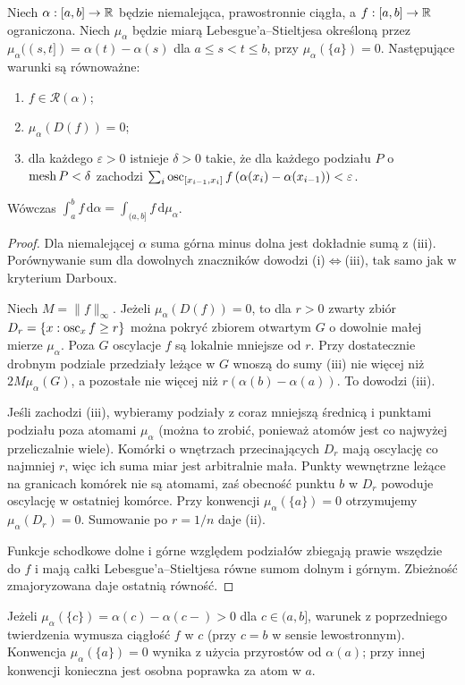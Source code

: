 \begin{twierdzenie}
Niech $\alpha:[a,b]\to\mathbb R$ będzie niemalejąca, prawostronnie ciągła, a $f:[a,b]\to\mathbb R$ ograniczona. Niech $\mu_\alpha$ będzie miarą Lebesgue'a--Stieltjesa określoną przez $\mu_\alpha((s,t])=\alpha(t)-\alpha(s)$ dla $a\le s<t\le b$, przy $\mu_\alpha(\{a\})=0$. Następujące warunki są równoważne:
\begin{enumerate}[label=(\roman*)]
\item $f\in\mathcal R(\alpha)$;
\item $\mu_\alpha(D(f))=0$;
\item dla każdego $\varepsilon>0$ istnieje $\delta>0$ takie, że dla każdego podziału $P$ o $\operatorname{mesh} P<\delta$ zachodzi $\sum_i\operatorname{osc}_{[x_{i-1},x_i]}f\,(\alpha(x_i)-\alpha(x_{i-1}))<\varepsilon$.
\end{enumerate}
Wówczas $\int_a^b f\,\mathrm d\alpha=\int_{(a,b]}f\,\mathrm d\mu_\alpha$.
\end{twierdzenie}
\begin{proof}
Dla niemalejącej $\alpha$ suma górna minus dolna jest dokładnie sumą z (iii). Porównywanie sum dla dowolnych znaczników dowodzi (i)$\Leftrightarrow$(iii), tak samo jak w kryterium Darboux.

Niech $M=\|f\|_\infty$. Jeżeli $\mu_\alpha(D(f))=0$, to dla $r>0$ zwarty zbiór $D_r=\{x:\operatorname{osc}_x f\ge r\}$ można pokryć zbiorem otwartym $G$ o dowolnie małej mierze $\mu_\alpha$. Poza $G$ oscylacje $f$ są lokalnie mniejsze od $r$. Przy dostatecznie drobnym podziale przedziały leżące w $G$ wnoszą do sumy (iii) nie więcej niż $2M\mu_\alpha(G)$, a pozostałe nie więcej niż $r(\alpha(b)-\alpha(a))$. To dowodzi (iii).

Jeśli zachodzi (iii), wybieramy podziały z coraz mniejszą średnicą i punktami podziału poza atomami $\mu_\alpha$ (można to zrobić, ponieważ atomów jest co najwyżej przeliczalnie wiele). Komórki o wnętrzach przecinających $D_r$ mają oscylację co najmniej $r$, więc ich suma miar jest arbitralnie mała. Punkty wewnętrzne leżące na granicach komórek nie są atomami, zaś obecność punktu $b$ w $D_r$ powoduje oscylację w ostatniej komórce. Przy konwencji $\mu_\alpha(\{a\})=0$ otrzymujemy $\mu_\alpha(D_r)=0$. Sumowanie po $r=1/n$ daje (ii).

Funkcje schodkowe dolne i górne względem podziałów zbiegają prawie wszędzie do $f$ i mają całki Lebesgue'a--Stieltjesa równe sumom dolnym i górnym. Zbieżność zmajoryzowana daje ostatnią równość.
\end{proof}
\begin{uwaga}
Jeżeli $\mu_\alpha(\{c\})=\alpha(c)-\alpha(c-)>0$ dla $c\in(a,b]$, warunek z poprzedniego twierdzenia wymusza ciągłość $f$ w $c$ (przy $c=b$ w sensie lewostronnym). Konwencja $\mu_\alpha(\{a\})=0$ wynika z użycia przyrostów od $\alpha(a)$; przy innej konwencji konieczna jest osobna poprawka za atom w $a$.
\end{uwaga}
